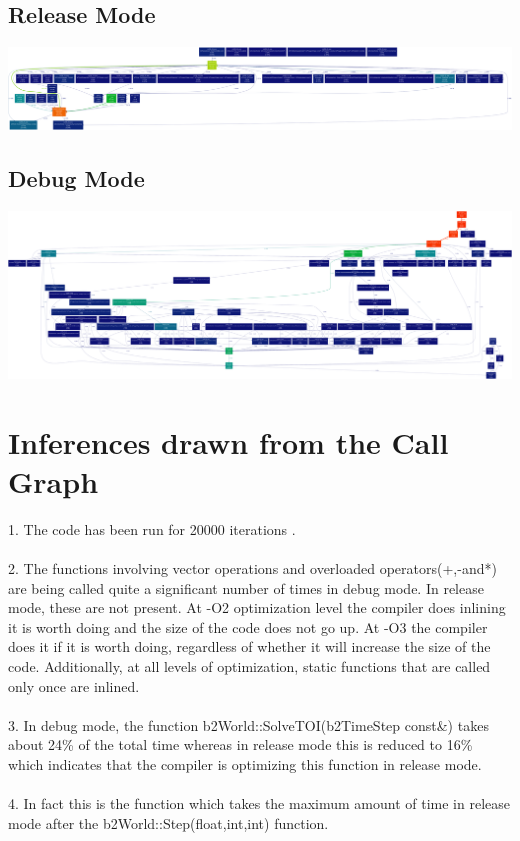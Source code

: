 \documentclass [11pt]{report}
\begin{document}
\subsection{Release Mode}
\begin{center}
\includegraphics [scale=0.10]{./images/release_output.png}
\end{center}

\subsection{Debug Mode}
\begin{center}
\includegraphics [scale=0.079]{./images/debug_output.png}
\end{center}

\section{Inferences drawn from the Call Graph}

1. The code has been run for 20000 iterations .\\ \\
2. The functions involving vector operations and overloaded operators(+,-and*) are being called quite a significant number of times in debug mode. In release mode, these are not present. At -O2 optimization level the compiler does inlining it is worth doing and the size of the code does not go up. At -O3 the compiler does it if it is worth doing, regardless of whether it will increase the size of the code. Additionally, at all levels of optimization, static functions that are called only once are inlined.\\ \\
3. In debug mode, the function b2World::SolveTOI(b2TimeStep const\&) takes about 24\% of the total time whereas in release mode this is reduced to 16\% which indicates that the compiler is optimizing this function in release mode.\\ \\
4. In fact this is the function which takes the maximum amount of time in release mode after the b2World::Step(float,int,int) function.\\
\end{document}
